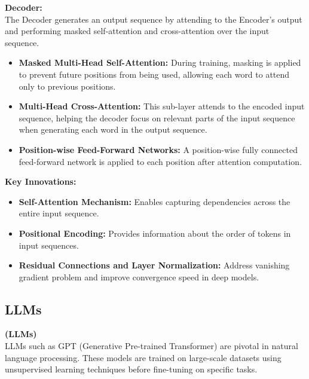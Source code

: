 \hfill \break
\textbf{Decoder:}  \\
The Decoder generates an output sequence by attending to the Encoder's output and performing masked self-attention and cross-attention over the input sequence.


\begin{itemize}
    \item \textbf{Masked Multi-Head Self-Attention:} During training, masking is applied to prevent future positions from being used, allowing each word to attend only to previous positions.
    
    \item \textbf{Multi-Head Cross-Attention:} This sub-layer attends to the encoded input sequence, helping the decoder focus on relevant parts of the input sequence when generating each word in the output sequence.
    
    \item \textbf{Position-wise Feed-Forward Networks:} A position-wise fully connected feed-forward network is applied to each position after attention computation.
\end{itemize}


\hfill \break
\textbf{Key Innovations:}

\begin{itemize}
    \item \textbf{Self-Attention Mechanism:} Enables capturing dependencies across the entire input sequence.
    
    \item \textbf{Positional Encoding:} Provides information about the order of tokens in input sequences.
    
    \item \textbf{Residual Connections and Layer Normalization:} Address vanishing gradient problem and improve convergence speed in deep models.
\end{itemize}

\newpage


\subsection{LLMs}

\hfill \break
\textbf{ (LLMs)} \\

LLMs such as GPT (Generative Pre-trained Transformer) are pivotal in natural language processing. These models are trained on large-scale datasets using unsupervised learning techniques before fine-tuning on specific tasks.


